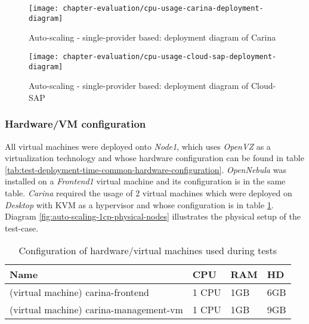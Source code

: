 \begin{asparaenum}
  \begin{figure}[!ht]
    \begin{center}
      \texttt{[image: chapter-evaluation/cpu-usage-carina-deployment-diagram]}
    \end{center}
    \caption{Auto-scaling - single-provider based: deployment diagram of Carina}
    \label{fig:auto-scaling-1cp-carina-deployment-diagram}
  \end{figure}

  \begin{figure}[!ht]
    \begin{center}
      \texttt{[image: chapter-evaluation/cpu-usage-cloud-sap-deployment-diagram]}
    \end{center}
    \caption{Auto-scaling - single-provider based: deployment diagram of Cloud-SAP}
    \label{fig:auto-scaling-1cp-cloud-sap-deployment-diagram}
  \end{figure}

  \end{asparaenum}

\newpage
\subsubsection*{Hardware/VM configuration}
All virtual machines were deployed onto \emph{Node1}, which uses \emph{OpenVZ} as a virtualization technology and whose hardware configuration can be found in table \ref{tab:test-deployment-time-common-hardware-configuration}. \emph{OpenNebula} was installed on a \emph{Frontend1} virtual machine and its configuration is in the same table. \emph{Carina} required the usage of 2 virtual machines which were deployed on \emph{Desktop} with KVM as a hypervisor and whose configuration is in table \ref{tab:test-auto-scaling-1cp-hardware-configuration}. Diagram \ref{fig:auto-scaling-1cp-physical-nodes} illustrates the physical setup of the test-case. 

\begin{table}
  \centering
  \begin{tabular}{ | l | l | l | l | }
    \hline                        
    Name & CPU & RAM & HD \\
    \hline
    (virtual machine) carina-frontend  & 1 CPU & 1GB & 6GB \\
    (virtual machine) carina-management-vm  & 1 CPU & 1GB & 9GB \\
    \hline  
  \end{tabular}
  \caption{Configuration of hardware/virtual machines used during tests}
  \label{tab:test-auto-scaling-1cp-hardware-configuration}
\end{table}

